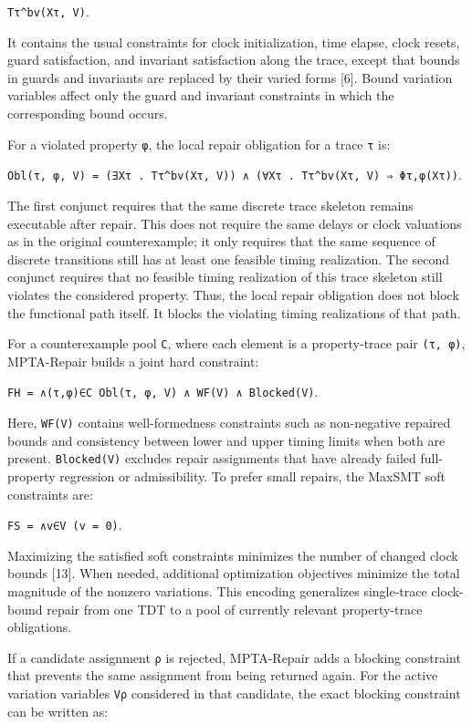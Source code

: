 \documentclass[
]{article}
\begin{document}
\texttt{Tτ\^{}bv(Xτ,\ V)}.

It contains the usual constraints for clock initialization, time elapse,
clock resets, guard satisfaction, and invariant satisfaction along the
trace, except that bounds in guards and invariants are replaced by their
varied forms {[}6{]}. Bound variation variables affect only the guard
and invariant constraints in which the corresponding bound occurs.

For a violated property \texttt{φ}, the local repair obligation for a
trace \texttt{τ} is:

\texttt{Obl(τ,\ φ,\ V)\ =\ (∃Xτ\ .\ Tτ\^{}bv(Xτ,\ V))\ ∧\ (∀Xτ\ .\ Tτ\^{}bv(Xτ,\ V)\ ⇒\ Φτ,φ(Xτ))}.

The first conjunct requires that the same discrete trace skeleton
remains executable after repair. This does not require the same delays
or clock valuations as in the original counterexample; it only requires
that the same sequence of discrete transitions still has at least one
feasible timing realization. The second conjunct requires that no
feasible timing realization of this trace skeleton still violates the
considered property. Thus, the local repair obligation does not block
the functional path itself. It blocks the violating timing realizations
of that path.

For a counterexample pool \texttt{C}, where each element is a
property-trace pair \texttt{(τ,\ φ)}, MPTA-Repair builds a joint hard
constraint:

\texttt{FH\ =\ ∧(τ,φ)∈C\ Obl(τ,\ φ,\ V)\ ∧\ WF(V)\ ∧\ Blocked(V)}.

Here, \texttt{WF(V)} contains well-formedness constraints such as
non-negative repaired bounds and consistency between lower and upper
timing limits when both are present. \texttt{Blocked(V)} excludes repair
assignments that have already failed full-property regression or
admissibility. To prefer small repairs, the MaxSMT soft constraints are:

\texttt{FS\ =\ ∧v∈V\ (v\ =\ 0)}.

Maximizing the satisfied soft constraints minimizes the number of
changed clock bounds {[}13{]}. When needed, additional optimization
objectives minimize the total magnitude of the nonzero variations. This
encoding generalizes single-trace clock-bound repair from one TDT to a
pool of currently relevant property-trace obligations.

If a candidate assignment \texttt{ρ} is rejected, MPTA-Repair adds a
blocking constraint that prevents the same assignment from being
returned again. For the active variation variables \texttt{Vρ}
considered in that candidate, the exact blocking constraint can be
written as:
\end{document}
